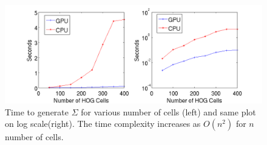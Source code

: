 \documentclass[10pt,twocolumn,letterpaper]{article}
\begin{document}



\begin{figure}[t]
  \begin{center}
     \includegraphics[width=0.9\linewidth]{covariancetime} 
  \end{center}
  \caption{Time to generate $\Sigma$ for various number of cells (left) and same plot on log scale(right). The time complexity increases as $O(n^2)$ for $n$ number of cells.}
  \label{fig:covariancetime_crop}
\end{figure}
 
\end{document}
